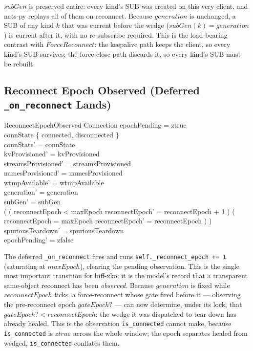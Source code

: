 \documentclass[a4paper,10pt,fleqn]{article}
\begin{document}
$subGen$ is preserved entire: every kind's SUB was created on this very
client, and nats-py replays all of them on reconnect.  Because $generation$
is unchanged, a SUB of any kind $k$ that was current before the wedge
($subGen(k) = generation$) is current after it, with no re-subscribe
required.  This is the load-bearing contrast with $ForceReconnect$: the
keepalive path keeps the client, so every kind's SUB survives; the
force-close path discards it, so every kind's SUB must be rebuilt.

\subsection{Reconnect Epoch Observed (Deferred \texttt{\_on\_reconnect}
Lands)}

\begin{schema}{ReconnectEpochObserved}
  \Delta Connection
  \where
  epochPending = ztrue \\
  connState \in \{ connected, disconnected \} \\
  connState' = connState \\
  kvProvisioned' = kvProvisioned \\
  streamsProvisioned' = streamsProvisioned \\
  namesProvisioned' = namesProvisioned \\
  wtmpAvailable' = wtmpAvailable \\
  generation' = generation \\
  subGen' = subGen \\
  ( ( reconnectEpoch < maxEpoch \land
      reconnectEpoch' = reconnectEpoch + 1 ) \lor
    ( reconnectEpoch = maxEpoch \land
      reconnectEpoch' = reconnectEpoch ) ) \\
  spuriousTeardown' = spuriousTeardown \\
  epochPending' = zfalse
\end{schema}

The deferred \texttt{\_on\_reconnect} fires and runs
\texttt{self.\_reconnect\_epoch += 1} (saturating at $maxEpoch$),
clearing the pending observation.  This is the single most important
transition for biff-xko: it is the model's record that a transparent
same-object reconnect has been \emph{observed}.  Because $generation$ is
fixed while $reconnectEpoch$ ticks, a force-reconnect whose gate fired
before it --- observing the pre-reconnect epoch $gateEpoch?$ --- can now
determine, under its lock, that $gateEpoch? < reconnectEpoch$: the wedge
it was dispatched to tear down has already healed.  This is the
observation \texttt{is\_connected} cannot make, because
\texttt{is\_connected} is $ztrue$ across the whole window; the epoch
separates healed from wedged, \texttt{is\_connected} conflates them.
\end{document}
